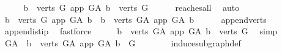 \begin{isabellebody}
\isamarkupfalse%
\ {\isacharminus}{\kern0pt}\isanewline
\ \ \isamarkupfalse%
\ {\isachardoublequoteopen}{\isacharbraceleft}{\kern0pt}b\ {\isasymin}\ verts\ G{\isachardot}{\kern0pt}\ app\ {\isasymrightarrow}\isactrlsup {\isacharplus}{\kern0pt}\isactrlbsub G{\isacharunderscore}{\kern0pt}A\isactrlesub \ b{\isacharbraceright}{\kern0pt}\ {\isacharequal}{\kern0pt}\ verts\ G{\isachardoublequoteclose}\isanewline
\ \ \ \ \isamarkupfalse%
\ reaches{\isacharunderscore}{\kern0pt}all\ \isamarkupfalse%
\ auto\isanewline
\ \ \isamarkupfalse%
\ \isamarkupfalse%
\ {\isachardoublequoteopen}{\isacharbraceleft}{\kern0pt}b\ {\isasymin}\ verts\ G{\isachardot}{\kern0pt}\ app\ {\isasymrightarrow}\isactrlsup {\isacharplus}{\kern0pt}\isactrlbsub G{\isacharunderscore}{\kern0pt}A\isactrlesub \ b{\isacharbraceright}{\kern0pt}\ {\isacharequal}{\kern0pt}\ {\isacharbraceleft}{\kern0pt}b\ {\isasymin}\ verts\ G{\isacharunderscore}{\kern0pt}A{\isachardot}{\kern0pt}\ app\ {\isasymrightarrow}\isactrlsup {\isacharplus}{\kern0pt}\isactrlbsub G{\isacharunderscore}{\kern0pt}A\isactrlesub \ b{\isacharbraceright}{\kern0pt}{\isachardoublequoteclose}\isanewline
\ \ \ \ \isamarkupfalse%
\ append{\isacharunderscore}{\kern0pt}verts\ \isamarkupfalse%
\ append{\isacharunderscore}{\kern0pt}is{\isacharunderscore}{\kern0pt}tip\ \isamarkupfalse%
\ fastforce\isanewline
\ \ \isamarkupfalse%
\ \isamarkupfalse%
\ {\isachardoublequoteopen}{\isacharbraceleft}{\kern0pt}b\ {\isasymin}\ verts\ G{\isacharunderscore}{\kern0pt}A{\isachardot}{\kern0pt}\ app\ {\isasymrightarrow}\isactrlsup {\isacharplus}{\kern0pt}\isactrlbsub G{\isacharunderscore}{\kern0pt}A\isactrlesub \ b{\isacharbraceright}{\kern0pt}\ {\isacharequal}{\kern0pt}\ verts\ G{\isachardoublequoteclose}\ \isamarkupfalse%
\ simp\ \isanewline
\ \ \isamarkupfalse%
\ \isamarkupfalse%
\ {\isachardoublequoteopen}G{\isacharunderscore}{\kern0pt}A\ {\isasymrestriction}\ {\isacharbraceleft}{\kern0pt}b\ {\isasymin}\ verts\ G{\isacharunderscore}{\kern0pt}A{\isachardot}{\kern0pt}\ app\ {\isasymrightarrow}\isactrlsup {\isacharplus}{\kern0pt}\isactrlbsub G{\isacharunderscore}{\kern0pt}A\isactrlesub \ b{\isacharbraceright}{\kern0pt}\ {\isacharequal}{\kern0pt}\ G\ {\isachardoublequoteclose}\ \isanewline
\ \ \ \ \isamarkupfalse%
\ induce{\isacharunderscore}{\kern0pt}subgraph{\isacharunderscore}{\kern0pt}def\ \isanewline

\end{isabellebody}
